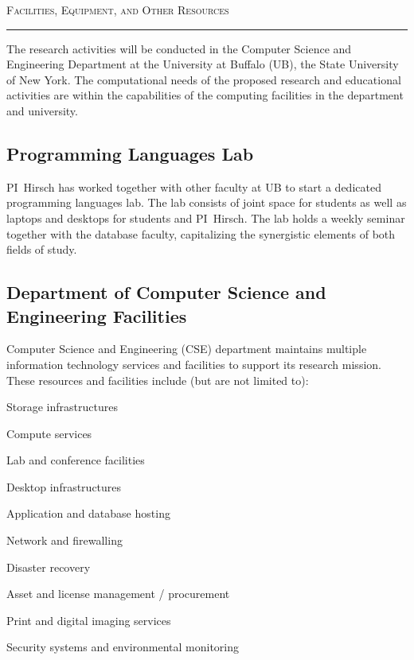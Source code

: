 

\usepackage{paralist}



\begin{center}
{\LARGE
\textsc{Facilities, Equipment, and Other Resources}
}
\end{center}
\hrule

\vspace{3mm}

The research activities will be conducted in the Computer Science and Engineering Department at the University at Buffalo (UB), the State University of New York.
The computational needs of the proposed research and educational activities are within the capabilities of the computing facilities in the department and university.

\subsection*{Programming Languages Lab}
PI~Hirsch has worked together with other faculty at UB to start a dedicated programming languages lab.
The lab consists of joint space for students as well as laptops and desktops for students and PI~Hirsch.
The lab holds a weekly seminar together with the database faculty, capitalizing the synergistic elements of both fields of study.

\subsection*{Department of Computer Science and Engineering Facilities}

Computer Science and Engineering (CSE) department maintains multiple information technology services and facilities to support its research mission.
These resources and facilities include (but are not limited to): 

\medskip 
\begin{compactitem}
  \item Storage infrastructures
  \item Compute services
  \item Lab and conference facilities
  \item Desktop infrastructures
  \item Application and database hosting
  \item Network and firewalling
  \item Disaster recovery
  \item Asset and license management / procurement
  \item Print and digital imaging services
  \item Security systems and environmental monitoring 
\end{compactitem}


